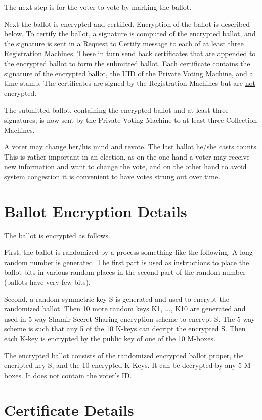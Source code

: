 \documentclass[12pt]{article}
\begin{document}
The next step is for the voter to vote by marking the ballot.

Next the ballot is encrypted and certified.  Encryption of the
ballot is described below.  To certify the ballot, a signature
is computed of the encrypted ballot, and the signature is sent
in a Request to Certify message to each of at least three Registration
Machines.  These in turn send back certificates that are appended
to the encrypted ballot to form the submitted ballot.  Each
certificate contains the signature of the encrypted ballot, the
UID of the Private Voting Machine, and a time stamp.  The certificates
are signed by the Registration Machines but are \underline{not} encrypted.

The submitted ballot, containing the encrypted ballot and
at least three signatures, is now sent by the Private Voting
Machine to at least three Collection Machines.

A voter may change her/his mind and revote.  The last ballot
he/she casts counts.  This is rather important in an election,
as on the one hand a voter may receive new information and
want to change the vote, and on the other hand to avoid system
congestion it is convenient to have votes strung out over time.

\section{Ballot Encryption Details}

The ballot is encrypted as follows.

First, the ballot is randomized by a process something like
the following.  A long random number is generated.  The first
part is used as instructions to place the ballot bits in
various random places in the second part of the random number
(ballots have very few bits).

Second, a random symmetric key S is generated and used to encrypt
the randomized ballot.  Then 10 more random keys K1, ..., K10 are generated
and used in 5-way Shamir Secret Sharing encryption
scheme to encrypt S.  The 5-way
scheme is such that any 5 of the 10 K-keys can decript the encrypted S.
Then each K-key is encrypted by the public key of one of the 10 M-boxes.

The encrypted ballot consists of the randomized encrypted ballot proper,
the encripted key S, and the 10 encrypted K-Keys.  It can be decrypted
by any 5 M-boxes.  It does \underline{not} contain the voter's ID.

\section{Certificate Details}
\end{document}

